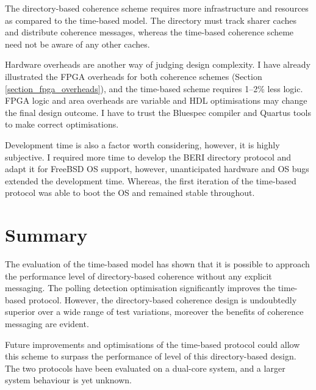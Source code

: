 		The directory-based coherence scheme requires more infrastructure and resources as compared to the time-based model. The directory must track sharer caches and distribute coherence messages, whereas the time-based coherence scheme need not be aware of any other caches.
		
		Hardware overheads are another way of judging design complexity. I have already illustrated the FPGA overheads for both coherence schemes (Section \ref{section_fpga_overheads}), and the time-based scheme requires 1--2\% less logic. FPGA logic and area overheads are variable and HDL optimisations may change the final design outcome. I have to trust the Bluespec compiler and Quartus tools to make correct optimisations.
		
		Development time is also a factor worth considering, however, it is highly subjective. I required more time to develop the BERI directory protocol and adapt it for FreeBSD OS support, however, unanticipated hardware and OS bugs extended the development time. Whereas, the first iteration of the time-based protocol was able to boot the OS and remained stable throughout.

	\section{Summary}
		The evaluation of the time-based model has shown that it is possible to approach the performance level of directory-based coherence without any explicit messaging. The polling detection optimisation significantly improves the time-based protocol. However, the directory-based coherence design is undoubtedly superior over a wide range of test variations, moreover the benefits of coherence messaging are evident. 
		
		Future improvements and optimisations of the time-based protocol could allow this scheme to surpass the performance of level of this directory-based design. The two protocols have been evaluated on a dual-core system, and a larger system behaviour is yet unknown.

